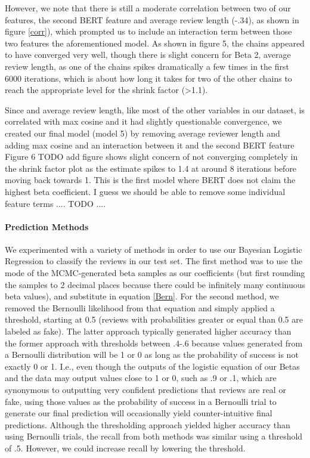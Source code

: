 \documentclass[man, floatsintext, 10pt]{apa6}
\begin{document}
However, we note that there is still a moderate correlation between two of our features, the second BERT feature and average review length (-.34), as shown in figure \ref{corr}), which prompted us to include an interaction term between those two features the aforementioned model. As shown in  figure 5, the chains appeared to have converged very well, though there is slight concern for Beta 2, average review length, as one of the chains spikes dramatically a few times in the first 6000 iterations, which is about how long it takes for two of the other chains to reach the appropriate level for the shrink factor (>1.1). 

Since and average review length, like most of the other variables in our dataset, is correlated with max cosine and it had slightly questionable convergence, we created our final model (model 5) by removing average reviewer length and adding max cosine and an interaction between it and the second BERT feature  Figure 6 TODO add figure  shows slight concern of not converging completely in the shrink factor plot as the estimate spikes to 1.4 at around 8 iterations before moving back towards 1. This is the first model where BERT does not claim the highest beta coefficient.   I guess we should be able to remove some individual feature terms .... TODO ....

\vspace{2mm}

\paragraph{Prediction Methods} We experimented with a variety of methods in order to use our Bayesian Logistic Regression to classify the reviews in our test set. The first method was to use the mode of the MCMC-generated beta samples as our coefficients (but first rounding the samples to 2 decimal places because there could be infinitely many continuous beta values), and substitute in equation \ref{Bern}. For the second method, we removed the Bernoulli likelihood from that equation and simply applied a threshold, starting at 0.5 (reviews with probabilities greater or equal than 0.5 are labeled as fake). The latter approach typically generated higher accuracy than the former approach with thresholds between .4-.6 because values generated from a Bernoulli distribution will be 1 or 0 as long as the probability of success is not exactly 0 or 1. I.e., even though the outputs of the logistic equation of our Betas and the data may output values close to 1 or 0, such as .9 or .1, which are synonymous to outputting very confident predictions that reviews are real or fake, using those values as the probability of success in a Bernoulli trial to generate our final prediction will occasionally yield counter-intuitive final predictions. Although the thresholding approach yielded higher accuracy than using Bernoulli trials, the recall from both methods was similar using a threshold of .5. However, we could increase recall by lowering the threshold. 
\end{document}
